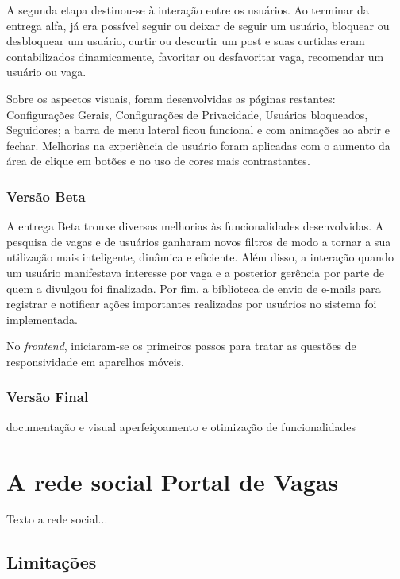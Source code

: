 \documentclass[cic,tc]{iiufrgs}
\begin{document}
A segunda etapa destinou-se à interação entre os usuários. Ao terminar da entrega alfa, já era possível seguir ou deixar de seguir um usuário, bloquear ou desbloquear um usuário, curtir ou descurtir um post e suas curtidas eram contabilizados dinamicamente, favoritar ou desfavoritar vaga, recomendar um usuário ou vaga. 

Sobre os aspectos visuais, foram desenvolvidas as páginas restantes: Configurações Gerais, Configurações de Privacidade, Usuários bloqueados, Seguidores; a barra de menu lateral ficou funcional e com animações ao abrir e fechar. Melhorias na experiência de usuário foram aplicadas com o aumento da área de clique em botões e no uso de cores mais contrastantes.

\subsection{Versão Beta}
\label{implementacaoBR}

A entrega Beta trouxe diversas melhorias às funcionalidades desenvolvidas. A pesquisa de vagas e de usuários ganharam novos filtros de modo a tornar a sua utilização mais inteligente, dinâmica e eficiente. Além disso, a interação quando um usuário manifestava interesse por vaga e a posterior gerência por parte de quem a divulgou foi finalizada. Por fim, a biblioteca de envio de e-mails para registrar e notificar ações importantes realizadas por usuários no sistema foi implementada.

No \textit{frontend}, iniciaram-se os primeiros passos para tratar as questões de responsividade em aparelhos móveis.

\subsection{Versão Final}
\label{implementacaoFR}

documentação e visual
aperfeiçoamento e otimização de funcionalidades


\chapter{A rede social Portal de Vagas}
\label{redeSocialPortal}

Texto a rede social...

\section{Limitações}
\label{redeLimitacao}
\end{document}
